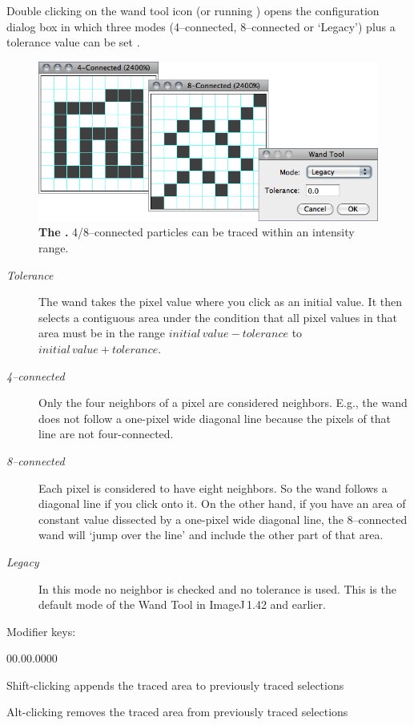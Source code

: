 Double clicking on the wand tool icon (or running \textsf{})
opens the configuration dialog box in which three modes (4--connected,
8--connected or `Legacy') plus a tolerance value can be set \cite{C-WandTool}.
\begin{figure}[h]
\noindent \includegraphics[scale=0.55]{images/WandTool}\caption{\textbf{The . }4/8--connected particles can
be traced within an intensity range.}
\end{figure}
\textbf{\emph{ }}
\begin{description}
\item [{\emph{\label{misc:WandTolerance}Tolerance}}] The wand takes the
pixel value where you click as an initial value. It then selects a
contiguous area under the condition that all pixel values in that
area must be in the range $initial\, value-tolerance$ to $initial\, value+tolerance$.
\item [{\emph{\label{misc:Wand4Connected}4--connected}}] Only the four
neighbors of a pixel are considered neighbors. E.g., the wand does
not follow a one-pixel wide diagonal line because the pixels of that
line are not four-connected.
\item [{\emph{\label{misc:Wand8Connected}8--connected}}] Each pixel is
considered to have eight neighbors. So the wand follows a diagonal
line if you click onto it. On the other hand, if you have an area
of constant value dissected by a one-pixel wide diagonal line, the
8--connected wand will `jump over the line' and include the other
part of that area.
\item [{\emph{Legacy}}] In this mode no neighbor is checked and no tolerance
is used. This is the default mode of the Wand Tool in ImageJ\,1.42
and earlier.
\end{description}
Modifier keys:
\begin{lyxlist}{00.00.0000}
\item [{\mykeystroke{Shift}}] \noindent Shift-clicking appends the traced
area to previously traced selections
\item [{\mykeystroke{Alt}}] \noindent Alt-clicking removes the traced
area from previously traced selections
\end{lyxlist}


